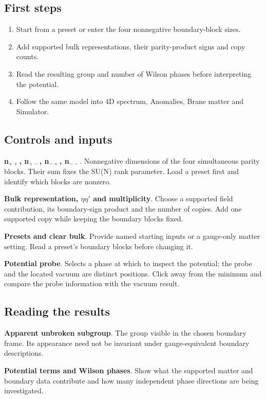 \documentclass[11pt,a4paper]{article}
\begin{document}
\subsection*{First steps}
\begin{enumerate}
\item Start from a preset or enter the four nonnegative boundary-block sizes.
\item Add supported bulk representations, their parity-product signs and copy counts.
\item Read the resulting group and number of Wilson phases before interpreting the potential.
\item Follow the same model into 4D spectrum, Anomalies, Brane matter and Simulator.
\end{enumerate}
\subsection*{Controls and inputs}
\textbf{n\ensuremath{{}_{++}}, n\ensuremath{{}_{+-}}, n\ensuremath{{}_{-+}}, n\ensuremath{{}_{--}}}. Nonnegative dimensions of the four simultaneous parity blocks. Their sum fixes the SU(N) rank parameter. Load a preset first and identify which blocks are nonzero.

\textbf{Bulk representation, \ensuremath{\eta}\ensuremath{\eta}\ensuremath{\prime} and multiplicity}. Choose a supported field contribution, its boundary-sign product and the number of copies. Add one supported copy while keeping the boundary blocks fixed.

\textbf{Presets and clear bulk}. Provide named starting inputs or a gauge-only matter setting. Read a preset's boundary blocks before changing it.

\textbf{Potential probe}. Selects a phase at which to inspect the potential; the probe and the located vacuum are distinct positions. Click away from the minimum and compare the probe information with the vacuum result.

\subsection*{Reading the results}
\textbf{Apparent unbroken subgroup}. The group visible in the chosen boundary frame. Its appearance need not be invariant under gauge-equivalent boundary descriptions.

\textbf{Potential terms and Wilson phases}. Show what the supported matter and boundary data contribute and how many independent phase directions are being investigated.
\end{document}
